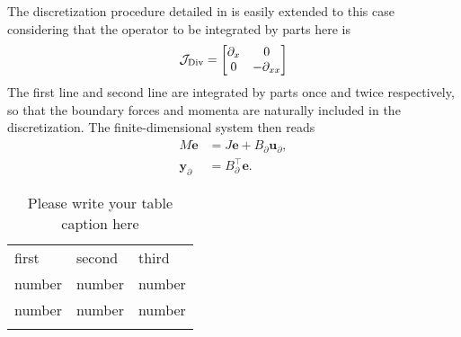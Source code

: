 The discretization procedure detailed in  is easily extended to this case considering that the operator to be integrated by parts here is 
\[
\mathcal{J}_{\operatorname*{Div}} = \begin{bmatrix}
\partial_x & 0 \\
0 & -\partial_{xx} \\
\end{bmatrix}
\]
The first line and second line are integrated by parts once and twice respectively, so that the boundary forces and momenta are naturally included in the discretization. The finite-dimensional system then reads
\begin{equation}
\begin{aligned}
{M} \dot{\bm{e}} &= J \bm{e} + {B}_\partial \bm{u}_\partial, \\
\bm{y}_\partial &= {B}_\partial^\top \bm{e}.
\end{aligned}
\end{equation}

\begin{table}
\caption{Please write your table caption here}
\label{tab:1}       %
\begin{tabular}{lll}
\hline\noalign{\smallskip}
first & second & third  \\
\noalign{\smallskip}\hline\noalign{\smallskip}
number & number & number \\
number & number & number \\
\noalign{\smallskip}\hline
\end{tabular}
\end{table}




 




